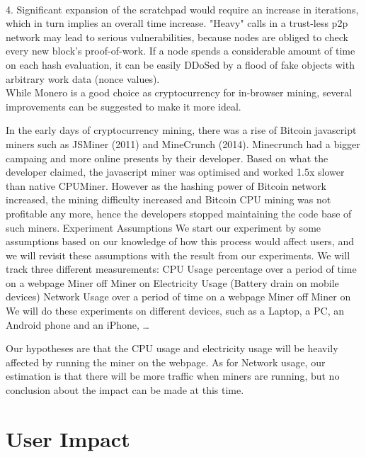 \\
4. Significant expansion of the scratchpad would require an increase in iterations, which in turn implies an overall time increase. "Heavy" calls in a trust-less p2p network may lead to serious vulnerabilities, because nodes are obliged to check every new block's proof-of-work. If a node spends a considerable amount of time on each hash evaluation, it can be easily DDoSed by a flood of fake objects with arbitrary work data (nonce values).
\\
While Monero is a good choice as cryptocurrency for in-browser mining, several improvements can be suggested to make it more ideal. 




In the early days of cryptocurrency mining, there was a rise of Bitcoin javascript miners such as JSMiner (2011) and MineCrunch (2014). Minecrunch had a bigger campaing and more online presents by their developer. Based on what the developer claimed, the javascript miner was optimised and worked 1.5x slower than native CPUMiner. However as the hashing power of Bitcoin network increased, the mining difficulty increased and Bitcoin CPU mining was not profitable any more, hence the developers stopped maintaining the code base of such miners.   
Experiment
Assumptions
	We start our experiment by some assumptions based on our knowledge of how this process would affect users, and we will revisit these assumptions with the result from our experiments.
We will track three different measurements:
CPU Usage percentage over a period of time on a webpage
Miner off
Miner on
Electricity Usage (Battery drain on mobile devices)
Network Usage over a period of time on a webpage
Miner off
Miner on
We will do these experiments on different devices, such as a Laptop, a PC, an Android phone and an iPhone, …

Our hypotheses are that the CPU usage and electricity usage will be heavily affected by running the miner on the webpage. As for Network usage, our estimation is that there will be more traffic when miners are running, but no conclusion about the impact can be made at this time.


\section{User Impact}


